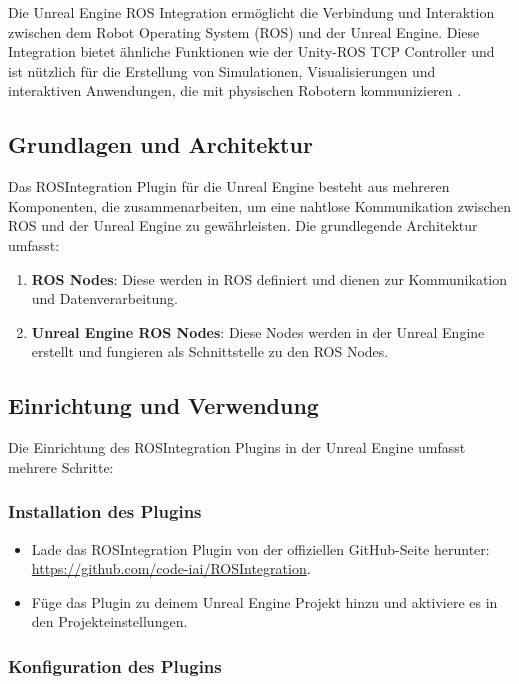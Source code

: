 Die Unreal Engine ROS Integration ermöglicht die Verbindung und Interaktion zwischen dem Robot Operating System (ROS) und der Unreal Engine. Diese Integration bietet ähnliche Funktionen wie der Unity-ROS TCP Controller und ist nützlich für die Erstellung von Simulationen, Visualisierungen und interaktiven Anwendungen, die mit physischen Robotern kommunizieren \cite{ros_integration_github}.

\subsection{Grundlagen und Architektur}

Das ROSIntegration Plugin für die Unreal Engine besteht aus mehreren Komponenten, die zusammenarbeiten, um eine nahtlose Kommunikation zwischen ROS und der Unreal Engine zu gewährleisten. Die grundlegende Architektur umfasst:

\begin{enumerate}
    \item \textbf{ROS Nodes}: Diese werden in ROS definiert und dienen zur Kommunikation und Datenverarbeitung.
    \item \textbf{Unreal Engine ROS Nodes}: Diese Nodes werden in der Unreal Engine erstellt und fungieren als Schnittstelle zu den ROS Nodes.
\end{enumerate}

\subsection{Einrichtung und Verwendung}

Die Einrichtung des ROSIntegration Plugins in der Unreal Engine umfasst mehrere Schritte:

\subsubsection{Installation des Plugins}

\begin{itemize}
    \item Lade das ROSIntegration Plugin von der offiziellen GitHub-Seite herunter: \url{https://github.com/code-iai/ROSIntegration}.
    \item Füge das Plugin zu deinem Unreal Engine Projekt hinzu und aktiviere es in den Projekteinstellungen.
\end{itemize}

\subsubsection{Konfiguration des Plugins}

